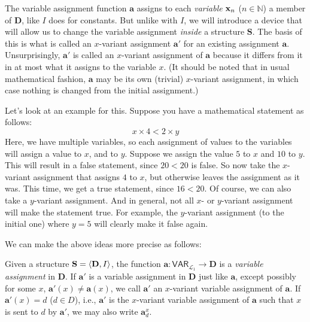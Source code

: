 The variable assignment function $\mathbf{a}$ assigns to each \textit{variable} $\mathbf{x}_{n}$ ($n \in \mathbb{N}$) a member of $\mathbf{D}$, like $I$ does for constants. But unlike with $I$, we will introduce a device that will allow us to change the variable assignment \textit{inside} a structure $\mathbf{S}$. The basis of this is what is called an $x$-variant assignment $\mathbf{a}'$ for an existing assignment $\mathbf{a}$. Unsurprisingly, $\mathbf{a}'$ is called an $x$-variant assignment of $\mathbf{a}$ because it differs from it in at most what it assigns to the variable $x$. (It should be noted that in usual mathematical fashion, $\mathbf{a}$ may be its own (trivial) $x$-variant assignment, in which case nothing is changed from the initial assignment.) 

Let's look at an example for this. Suppose you have a mathematical statement as follows:
\[
x \times 4 < 2 \times y
\]
Here, we have multiple variables, so each assignment of values to the variables will assign a value to $x$, and to $y$. Suppose we assign the value $5$ to $x$ and $10$ to $y$. This will result in a false statement, since $20<20$ is false. So now take the $x$-variant assignment that assigns $4$ to $x$, but otherwise leaves the assignment as it was. This time, we get a true statement, since $16 <20$. Of course, we can also take a $y$-variant assignment. And in general, not all $x$- or $y$-variant assignment will make the statement true. For example, the $y$-variant assignment (to the initial one) where $y=5$ will clearly make it false again. 

We can make the above ideas more precise as follows:

\begin{defn}
Given a structure $\mathbf{S}=\langle\mathbf{D}, I\rangle$, the function $\mathbf{a}: \textsf{VAR}_{\mathcal{L}_1} \to \mathbf{D}$ is a \textit{variable assignment} in $\mathbf{D}$. If $\mathbf{a}'$ is a variable assignment in $\mathbf{D}$ just like $\mathbf{a}$, except possibly for some $x$, $\mathbf{a}'(x)\neq \mathbf{a}(x)$, we call $\mathbf{a}'$ an $x$-variant variable assignment of $\mathbf{a}$. If $\mathbf{a}'(x)=d$ ($d \in D$), i.e., $\mathbf{a}'$ is the $x$-variant variable assignment of $\mathbf{a}$ such that $x$ is sent to $d$ by $\mathbf{a}'$, we may also write $\mathbf{a}^x_d$.
\end{defn}


